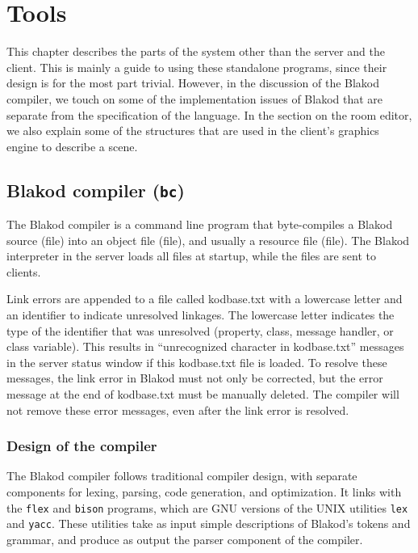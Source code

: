 \chapter{Tools}

This chapter describes the parts of the system other than the server
and the client.  This is mainly a guide to using these standalone
programs, since their design is for the most part trivial.  However,
in the discussion of the Blakod compiler, we touch on some of the
implementation issues of Blakod that are separate from the
specification of the language.  In the section on the room editor, we
also explain some of the structures that are used in the client's
graphics engine to describe a scene.

\section{Blakod compiler ({\tt bc})}
\label{sec:compiler}

The Blakod compiler is a command line program that byte-compiles a
Blakod source (\kod file) into an object file (\bof file), and usually a
resource file (\rsc file).  The Blakod interpreter in the server loads all
\bof files at startup, while the \rsc files are sent to clients.

Link errors are appended to a file called kodbase.txt with a lowercase
letter and an identifier to indicate unresolved linkages.  The
lowercase letter indicates the type of the identifier that was
unresolved (property, class, message handler, or class variable).
This results in ``unrecognized character in kodbase.txt'' messages in
the server status window if this kodbase.txt file is loaded.  To
resolve these messages, the link error in Blakod must not only be
corrected, but the error message at the end of kodbase.txt must be
manually deleted.  The compiler will not remove these error messages,
even after the link error is resolved.

\subsection{Design of the compiler}

The Blakod compiler follows traditional compiler design, with separate
components for lexing, parsing, code generation, and optimization.  It
links with the {\tt flex} and {\tt bison} programs, which are GNU
versions of the UNIX utilities {\tt lex} and {\tt yacc}.  These
utilities take as input simple descriptions of Blakod's tokens and
grammar, and produce as output the parser component of the compiler.

